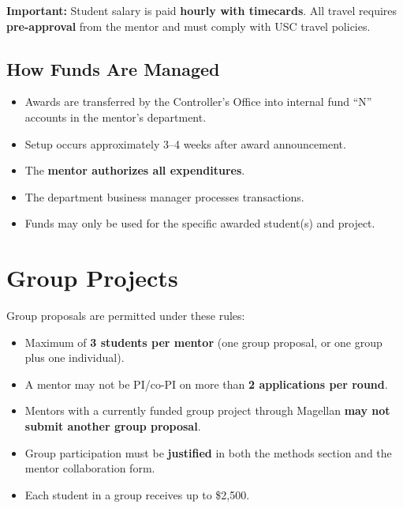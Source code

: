 \documentclass[11pt, letterpaper]{article}
\newcommand{\warnbox}[1]{%
\begin{tcolorbox}[colback=Black10, colframe=Rose]
\textbf{Important:} #1
\end{tcolorbox}
}
\begin{document}
\warnbox{Student salary is paid \textbf{hourly with timecards}. All travel requires \textbf{pre-approval} from the mentor and must comply with USC travel policies.}

\subsection{How Funds Are Managed}

\begin{itemize}[nosep]
    \item Awards are transferred by the Controller's Office into internal fund ``N'' accounts in the mentor's department.
    \item Setup occurs approximately 3--4 weeks after award announcement.
    \item The \textbf{mentor authorizes all expenditures}.
    \item The department business manager processes transactions.
    \item Funds may only be used for the specific awarded student(s) and project.
\end{itemize}

\section{Group Projects}

Group proposals are permitted under these rules:

\begin{itemize}[nosep]
    \item Maximum of \textbf{3 students per mentor} (one group proposal, or one group plus one individual).
    \item A mentor may not be PI/co-PI on more than \textbf{2 applications per round}.
    \item Mentors with a currently funded group project through Magellan \textbf{may not submit another group proposal}.
    \item Group participation must be \textbf{justified} in both the methods section and the mentor collaboration form.
    \item Each student in a group receives up to \$2,500.
\end{itemize}

\end{document}
